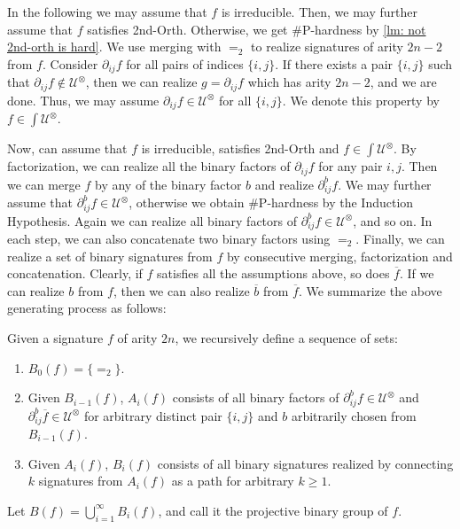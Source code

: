 In the following we may assume that $f$ is irreducible.
Then, we may further assume that $f$ satisfies {\sc 2nd-Orth}. 
Otherwise, we get \#P-hardness by \cref{lm: not 2nd-orth is hard}.
We use merging with $=_2$ to realize signatures of arity $2n-2$ from $f$.
Consider ${\partial}_{ij} f$ for all pairs of indices $\{i, j\}$. 
If there exists a pair $\{i, j\}$ such that ${\partial}_{ij} f \notin {\mathcal{U}}^{\otimes}$, 
then we can realize $g={\partial}_{ij}f$ which has arity $2n-2$, and we are done.
Thus, we may assume ${\partial}_{ij} f \in {\mathcal{U}}^{\otimes}$ for all $\{i, j\}$. 
We denote this property by $ f\in{\int}{\mathcal{U}}^{\otimes}$.

Now, can assume that $f$ is irreducible, satisfies {\sc 2nd-Orth} and $f\in {\int}{\mathcal{U}}^{\otimes}$. 
By factorization, we can realize all the binary factors of $\partial_{ij}f$ for any pair ${i,j}$.
Then we can merge $f$ by any of the binary factor $b$ and realize $\partial^b_{ij}f$.
We may further assume that $\partial^b_{ij}f\in \mathcal{U}^{\otimes}$, otherwise we obtain \#P-hardness by the Induction Hypothesis.
Again we can realize all binary factors of $\partial^b_{ij}f\in \mathcal{U}^{\otimes}$, and so on.
In each step, we can also concatenate two binary factors using $=_2$.
Finally, we can realize a set of binary signatures from $f$ by consecutive merging, factorization and concatenation.
Clearly, if $f$ satisfies all the assumptions above, so does $\overline{f}$.
If we can realize $b$ from $f$, then we can also realize $\overline{b}$ from $\overline{f}$.
We summarize the above generating process as follows:

\begin{definition} \label{def: generating process}
    Given a signature $f$ of arity $2n$, we recursively define a sequence of sets:
    \begin{enumerate}
        \item $B_0(f)=\{=_2\}$.
        
        \item Given $B_{i-1}(f)$, $A_i(f)$ consists of all binary factors of $\partial^{b}_{ij}f\in \mathcal{U}^{\otimes}$ and $\partial^{b}_{ij}\overline{f}\in \mathcal{U}^{\otimes}$ for arbitrary distinct pair $\{i,j\}$ and $b$ arbitrarily chosen from $B_{i-1}(f)$.

        \item Given $A_i(f)$, $B_i(f)$ consists of all binary signatures realized by connecting $k$ signatures from $A_i(f)$ as a path for arbitrary $k\ge 1$.
    \end{enumerate}
    Let $B(f)=\mathop{\bigcup}\limits_{i=1}^{\infty}B_i(f)$, and call it the projective binary group of $f$.
\end{definition}

